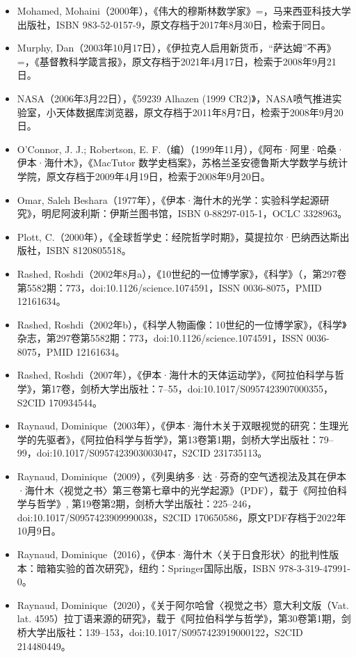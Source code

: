 \begin{itemize}
\item Mohamed, Mohaini（2000年），《伟大的穆斯林数学家》=，马来西亚科技大学出版社，ISBN 983-52-0157-9，原文存档于2017年8月30日，检索于同日。
\item Murphy, Dan（2003年10月17日），《伊拉克人启用新货币，“萨达姆”不再》=，《基督教科学箴言报》，原文存档于2021年4月17日，检索于2008年9月21日。
\item NASA（2006年3月22日），《59239 Alhazen (1999 CR2)》，NASA喷气推进实验室，小天体数据库浏览器，原文存档于2011年8月7日，检索于2008年9月20日。
\item O'Connor, J. J.; Robertson, E. F.（编）（1999年11月），《阿布·阿里·哈桑·伊本·海什木》，《MacTutor 数学史档案》，苏格兰圣安德鲁斯大学数学与统计学院，原文存档于2009年4月19日，检索于2008年9月20日。
\item Omar, Saleh Beshara（1977年），《伊本·海什木的光学：实验科学起源研究》，明尼阿波利斯：伊斯兰图书馆，ISBN 0-88297-015-1，OCLC 3328963。
\item Plott, C.（2000年），《全球哲学史：经院哲学时期》，莫提拉尔·巴纳西达斯出版社，ISBN 8120805518。
\item Rashed, Roshdi（2002年8月a），《10世纪的一位博学家》，《科学》（，第297卷第5582期：773，doi:10.1126/science.1074591，ISSN 0036-8075，PMID 12161634。
\item Rashed, Roshdi（2002年b），《科学人物画像：10世纪的一位博学家》，《科学》杂志，第297卷第5582期：773，doi:10.1126/science.1074591，ISSN 0036-8075，PMID 12161634。
\item Rashed, Roshdi（2007年），《伊本·海什木的天体运动学》，《阿拉伯科学与哲学》，第17卷，剑桥大学出版社：7–55，doi:10.1017/S0957423907000355，S2CID 170934544。
\item Raynaud, Dominique（2003年），《伊本·海什木关于双眼视觉的研究：生理光学的先驱者》，《阿拉伯科学与哲学》，第13卷第1期，剑桥大学出版社：79–99，doi:10.1017/S0957423903003047，S2CID 231735113。
\item Raynaud, Dominique（2009），《列奥纳多·达·芬奇的空气透视法及其在伊本·海什木〈视觉之书〉第三卷第七章中的光学起源》（PDF），载于《阿拉伯科学与哲学》, 第19卷第2期，剑桥大学出版社：225–246，doi:10.1017/S0957423909990038，S2CID 170650586，原文PDF存档于2022年10月9日。
\item Raynaud, Dominique（2016），《伊本·海什木〈关于日食形状〉的批判性版本：暗箱实验的首次研究》，纽约：Springer国际出版，ISBN 978-3-319-47991-0。
\item Raynaud, Dominique（2020），《关于阿尔哈曾〈视觉之书〉意大利文版（Vat. lat. 4595）拉丁语来源的研究》，载于《阿拉伯科学与哲学》，第30卷第1期，剑桥大学出版社：139–153，doi:10.1017/S0957423919000122，S2CID 214480449。

\end{itemize}

